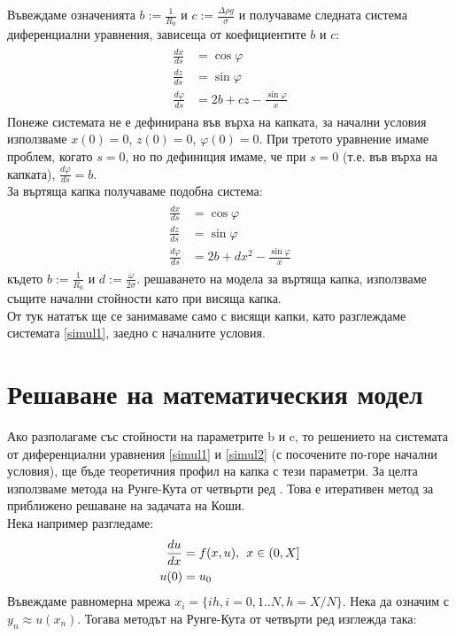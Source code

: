 \documentclass{article}
\begin{document}
Въвеждаме означенията
\large
\(b\!:=\frac{1}{R_0}\) \normalsize и \large \(c\!:=\frac{\Delta \rho g}{\sigma}\) 
\normalsize и получаваме следната система диференциални уравнения, зависеща от коефициентите \(b\) и \(c\):
\begin{align}
\begin{split} 
\frac {dx}{ds} &= \cos \varphi\label{simul1}\\
\frac {dz}{ds} &= \sin \varphi\\
\frac {d\varphi}{ds} &= 2b + cz - \frac{\sin \varphi}{x}
\end{split}
\end{align}
Понеже системата не е дефинирана във върха на капката, за начални условия използваме \(x(0)=0\), \(z(0)=0\), \(\varphi(0)=0\). При третото уравнение имаме проблем, когато \(s=0\), но по дефиниция имаме, че при \(s=0\) (т.е. във върха на капката), \large\begin{math}{\frac{d\varphi}{ds} = b}\end{math}\normalsize.\\
За въртяща капка получаваме подобна система:
\begin{align}
\begin{split}
\frac {dx}{ds} &= \cos \varphi\label{simul2}\\
\frac {dz}{ds} &= \sin \varphi\\
\frac {d\varphi}{ds} &= 2b + dx^2 - \frac{\sin \varphi}{x}
\end{split}
\end{align}
където 
\large
\(b\!:=\frac{1}{R_0}\) \normalsize и \large \(d\!:=\frac{\omega}{2\sigma}\). 
 решаването на модела за въртяща капка, използваме същите начални стойности като при висяща капка.\\
От тук нататък ще се занимаваме само с висящи капки, като разглеждаме системата \eqref{simul1}, заедно с началните условия.

\section{Решаване на математическия модел}
Ако разполагаме със стойности на параметрите b и c, то решението на системата от диференциални уравнения \eqref{simul1} и \eqref{simul2} (с посочените по-горе начални условия), ще бъде теоретичния профил на капка с тези параметри. За целта използваме метода на Рунге-Кута от четвърти ред \cite{runge-kutta}. Това е итеративен метод за приближено решаване на задачата на Коши.\\
Нека например разгледаме:
\begin{align*}
    \frac{du}{dx} &= f(x, u),\hspace{1ex}x \in {(0,X]}\\
    u(0) &= u_0
\end{align*}
Въвеждаме равномерна мрежа $x_i=\{ih, i=0,1 .. N, h=X/N\}$. Нека да означим с $y_n \approx u(x_n)$. Тогава методът на Рунге-Кута от четвърти ред изглежда така:
\end{document}
